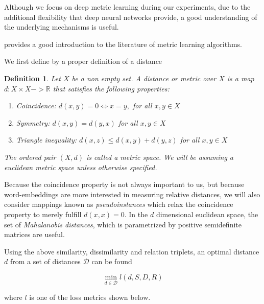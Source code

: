 \documentclass[a4paper,12pt,oneside,openright]{report}
\begin{document}
Although we focus on deep metric learning during our experiments, due to the additional flexibility that deep neural networks provide, a good understanding of the underlying mechanisms is useful.

\cite{suarez19} provides a good introduction to the literature of metric learning algorithms.

We first define by a proper definition of a distance \\

\newtheorem{mydef}{Definition}
\begin{mydef}
Let $X$ be a non empty set. A \textit{distance} or \textit{metric} over $X$ is a map $d: X \times X -> \mathbb{R}$ that satisfies the following properties:

\begin{enumerate}
\item Coincidence: $d(x, y) = 0 \iff x = y,$ for all $x, y \in X$
\item Symmetry: $d(x, y) = d(y, x)$ for all $x, y \in X$
\item Triangle inequality: $d(x, z) \leq d(x, y) + d(y, z) $ for all $x, y \in X$
\end{enumerate}
The ordered pair $(X, d)$ is called a metric space. 
We will be assuming a euclidean metric space unless otherwise specified.
\end{mydef}

\quad

Because the coincidence property is not always important to us, but because word-embeddings are more interested in measuring relative distances, we will also consider mappings known as \textit{pseudoinstances} which relax the coincidence property to merely fulfill $d(x, x) = 0$.
In the $d$ dimensional euclidean space, the set of \textit{Mahalanobis distances}, which is parametrized by positive semidefinite matrices are useful.

Using the above similarity, dissimilarity and relation triplets, an optimal distance $d$ from a set of distances $\mathcal{D}$ can be found

\begin{equation}
\min_{d \in \mathcal{D}} l (d, S, D, R)
\end{equation}

where $l$ is one of the loss metrics shown below.
\end{document}
